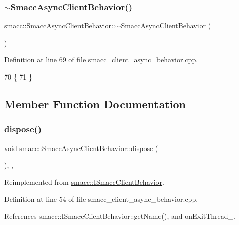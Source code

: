 \subsubsection{\texorpdfstring{$\sim$\+Smacc\+Async\+Client\+Behavior()}{~SmaccAsyncClientBehavior()}}
{\footnotesize\ttfamily smacc\+::\+Smacc\+Async\+Client\+Behavior\+::$\sim$\+Smacc\+Async\+Client\+Behavior (\begin{DoxyParamCaption}{ }\end{DoxyParamCaption})\hspace{0.3cm}{\ttfamily [virtual]}}



Definition at line 69 of file smacc\+\_\+client\+\_\+async\+\_\+behavior.\+cpp.


\begin{DoxyCode}
70     \{
71     \}
\end{DoxyCode}


\subsection{Member Function Documentation}
\mbox{\label{classsmacc_1_1SmaccAsyncClientBehavior_af475cee853947a8d3f513c7fb9789e7a}} 
\subsubsection{\texorpdfstring{dispose()}{dispose()}}
{\footnotesize\ttfamily void smacc\+::\+Smacc\+Async\+Client\+Behavior\+::dispose (\begin{DoxyParamCaption}{ }\end{DoxyParamCaption})\hspace{0.3cm}{\ttfamily [override]}, {\ttfamily [protected]}, {\ttfamily [virtual]}}



Reimplemented from \hyperlink{classsmacc_1_1ISmaccClientBehavior_abdc74a8d95fdd02794c19dfa90f8a6ce}{smacc\+::\+I\+Smacc\+Client\+Behavior}.



Definition at line 54 of file smacc\+\_\+client\+\_\+async\+\_\+behavior.\+cpp.



References smacc\+::\+I\+Smacc\+Client\+Behavior\+::get\+Name(), and on\+Exit\+Thread\+\_\+.


